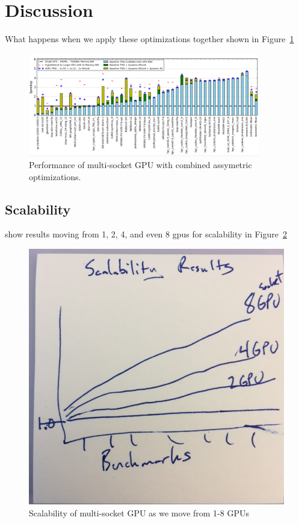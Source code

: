 \section {Discussion}

What happens when we apply these optimizations together shown in Figure~\ref{fig:combined}

\begin{figure}[tp]
    \centering
    \includegraphics[width=0.9\textwidth]{figures/resultscombined.jpg}
    \caption{Performance of multi-socket GPU with combined assymetric optimizations.}
    \label{fig:combined}
\end{figure}

\subsection {Scalability}

show results moving from 1, 2, 4, and even 8 gpus for scalability in Figure~\ref{fig:scalability}

\begin{figure}[tp]
    \centering
    \includegraphics[width=0.9\columnwidth]{figures/scalability.jpg}
    \caption{Scalability of multi-socket GPU as we move from 1-8 GPUs}
    \label{fig:scalability}
\end{figure}


